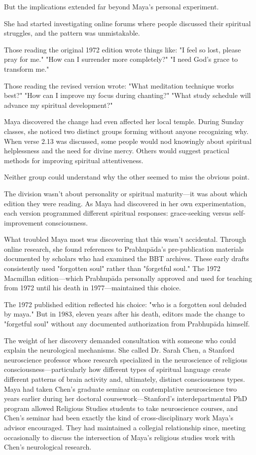 \documentclass[12pt,twoside]{book}
\begin{document}
But the implications extended far beyond Maya's personal experiment.

She had started investigating online forums where people discussed their spiritual struggles, and the pattern was unmistakable.

Those reading the original 1972 edition wrote things like: "I feel so lost, please pray for me." "How can I surrender more completely?" "I need God's grace to transform me."

Those reading the revised version wrote: "What meditation technique works best?" "How can I improve my focus during chanting?" "What study schedule will advance my spiritual development?"

Maya discovered the change had even affected her local temple. During Sunday classes, she noticed two distinct groups forming without anyone recognizing why. When verse 2.13 was discussed, some people would nod knowingly about spiritual helplessness and the need for divine mercy. Others would suggest practical methods for improving spiritual attentiveness.

Neither group could understand why the other seemed to miss the obvious point.

The division wasn't about personality or spiritual maturity—it was about which edition they were reading. As Maya had discovered in her own experimentation, each version programmed different spiritual responses: grace-seeking versus self-improvement consciousness.

What troubled Maya most was discovering that this wasn't accidental. Through online research, she found references to Prabhupāda's pre-publication materials documented by scholars who had examined the BBT archives. These early drafts consistently used "forgotten soul" rather than "forgetful soul." The 1972 Macmillan edition—which Prabhupāda personally approved and used for teaching from 1972 until his death in 1977—maintained this choice.

The 1972 published edition reflected his choice: "who is a forgotten soul deluded by maya." But in 1983, eleven years after his death, editors made the change to "forgetful soul" without any documented authorization from Prabhupāda himself.

The weight of her discovery demanded consultation with someone who could explain the neurological mechanisms. She called Dr. Sarah Chen, a Stanford neuroscience professor whose research specialized in the neuroscience of religious consciousness—particularly how different types of spiritual language create different patterns of brain activity and, ultimately, distinct consciousness types. Maya had taken Chen's graduate seminar on contemplative neuroscience two years earlier during her doctoral coursework—Stanford's interdepartmental PhD program allowed Religious Studies students to take neuroscience courses, and Chen's seminar had been exactly the kind of cross-disciplinary work Maya's advisor encouraged. They had maintained a collegial relationship since, meeting occasionally to discuss the intersection of Maya's religious studies work with Chen's neurological research.
\end{document}
